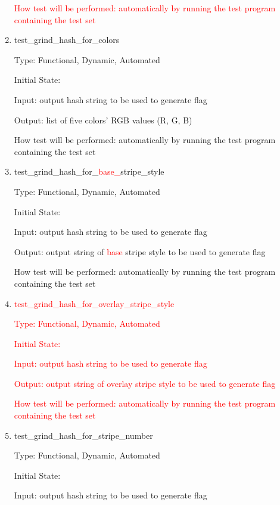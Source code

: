 \documentclass[12pt, titlepage]{article}
\begin{document}
\begin{enumerate}
\textcolor{red}{How test will be performed: automatically by running the test
program containing the test set}

\item{test\_grind\_hash\_for\_colors\\}

Type: Functional, Dynamic, Automated

Initial State:

Input: output hash string to be used to generate flag

Output: list of five colors' RGB values (R, G, B)

How test will be performed: automatically by running the test program
containing the test set

\item{test\_grind\_hash\_for\_\textcolor{red}{base\_}stripe\_style\\}

Type: Functional, Dynamic, Automated

Initial State:

Input: output hash string to be used to generate flag

Output: output string of \textcolor{red}{base} stripe style to be used to
generate flag

How test will be performed: automatically by running the test program
containing the test set

\item{\textcolor{red}{test\_grind\_hash\_for\_overlay\_stripe\_style\\}}

\textcolor{red}{Type: Functional, Dynamic, Automated}

\textcolor{red}{Initial State:}

\textcolor{red}{Input: output hash string to be used to generate flag}

\textcolor{red}{Output: output string of overlay stripe style to be used to
generate flag}

\textcolor{red}{How test will be performed: automatically by running the test
program containing the test set}

\item{test\_grind\_hash\_for\_stripe\_number\\}

Type: Functional, Dynamic, Automated

Initial State:

Input: output hash string to be used to generate flag


\end{enumerate}
\end{document}
